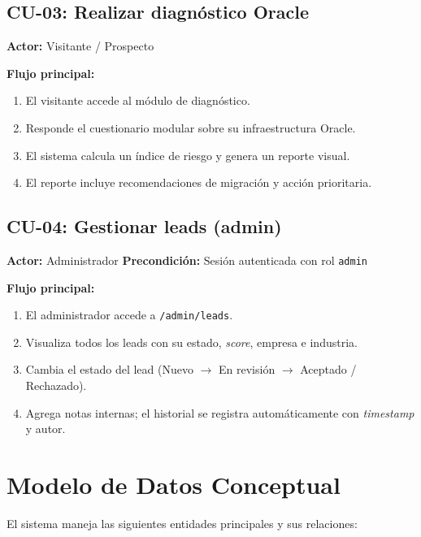 \documentclass[12pt, a4paper, twoside]{report}
\begin{document}
\subsection*{CU-03: Realizar diagnóstico Oracle}

\textbf{Actor:} Visitante / Prospecto

\textbf{Flujo principal:}
\begin{enumerate}
  \item El visitante accede al módulo de diagnóstico.
  \item Responde el cuestionario modular sobre su infraestructura Oracle.
  \item El sistema calcula un índice de riesgo y genera un reporte visual.
  \item El reporte incluye recomendaciones de migración y acción prioritaria.
\end{enumerate}

\subsection*{CU-04: Gestionar leads (admin)}

\textbf{Actor:} Administrador \quad
\textbf{Precondición:} Sesión autenticada con rol \texttt{admin}

\textbf{Flujo principal:}
\begin{enumerate}
  \item El administrador accede a \texttt{/admin/leads}.
  \item Visualiza todos los leads con su estado, \textit{score}, empresa e industria.
  \item Cambia el estado del lead (Nuevo $\to$ En revisión $\to$ Aceptado / Rechazado).
  \item Agrega notas internas; el historial se registra automáticamente con \textit{timestamp}
        y autor.
\end{enumerate}

\section{Modelo de Datos Conceptual}

El sistema maneja las siguientes entidades principales y sus relaciones:
\end{document}
